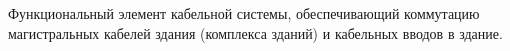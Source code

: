 Функциональный элемент кабельной системы,
обеспечивающий коммутацию магистральных кабелей здания 
(комплекса зданий) и кабельных вводов в здание.